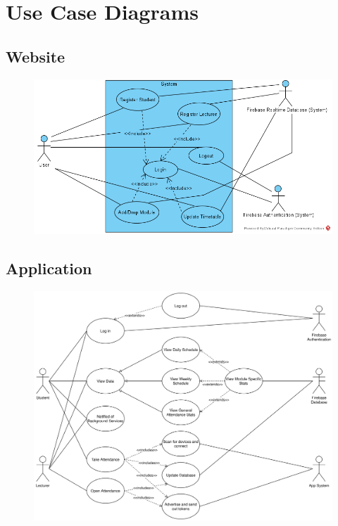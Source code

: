 \documentclass[../report.tex]{subfiles}
\begin{document}
\section{Use Case Diagrams}
\subsection{Website}
\begin{figure}[H]
\centering
\includegraphics[width=.9\textwidth]{./images/05/06-web-use-case.png}
\label{fig:web-use-case}
\end{figure}

\subsection{Application}
\begin{figure}[H]
\centering
\includegraphics[width=.9\textwidth]{./images/05/06-app-use-case.png}
\label{fig:app-use-case}
\end{figure}
\end{document}
